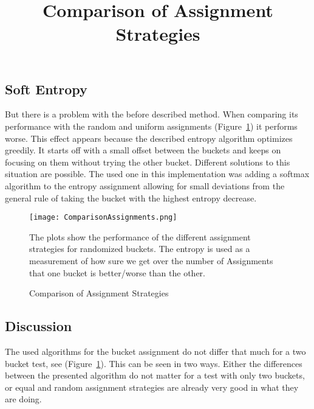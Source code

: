 \documentclass[../Thesis.tex]{subfiles}
\begin{document}
\subsection{Soft Entropy}
But there is a problem with the before described method. When comparing its performance with the random and uniform assignments (Figure~\ref{fig:AssignmentComp}) it performs worse. This effect appears because the described entropy algorithm optimizes greedily. It starts off with a small offset between the buckets and keeps on focusing on them without trying the other bucket. Different solutions to this situation are possible. The used one in this implementation was adding a softmax algorithm to the entropy assignment allowing for small deviations from the general rule of taking the bucket with the highest entropy decrease.
\begin{figure}[ht]
\hfuzz=10cm
\texttt{[image: ComparisonAssignments.png]}
\centering
\title{Comparison of Assignment Strategies}
\caption{Comparison of Assignment Strategies}
The plots show the performance of the different assignment strategies for randomized buckets. The entropy is used as a measurement of how sure we get over the number of Assignments that one bucket is better/worse than the other.
\label{fig:AssignmentComp}
\end{figure}
\subsection{Discussion}
The used algorithms for the bucket assignment do not differ that much for a two bucket test, see (Figure~\ref{fig:AssignmentComp}). This can be seen in two ways. Either the differences between the presented algorithm do not matter for a test with only two buckets, or equal and random assignment strategies are already very good in what they are doing.
\end{document}
